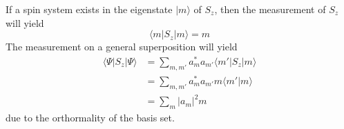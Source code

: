 \documentclass[11.5pt,a4paper]{article}
\begin{document}

If a spin system exists in the eigenstate $|m\rangle$ of $S_z$, then the measurement of $S_z$ will yield
\begin{equation}
 \langle m | S_z | m \rangle = m
\end{equation}
The measurement on a general superposition will yield
\begin{align}
 \langle \Psi | S_z | \Psi \rangle & = \sum_{m,m'} a_m^* a_{m'} \langle m' | S_z | m \rangle\\
  & = \sum_{m,m'} a_m^* a_{m'} m \langle m' | m \rangle\\
  & = \sum_{m} |a_{m}|^2  m
\end{align}
due to the orthormality of the basis set.
\end{document}
